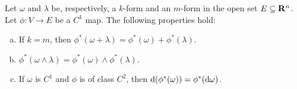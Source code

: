 \begin{proposition}
    \label{prop:algebraic-properties-pullback-forms}
    Let \(\omega\) and \(\lambda\) be, respectively, a \(k\)-form and an \(m\)-form
    in the open set \(E \subseteq \mathbf{R}^n\). Let \(\phi: V \to E\) be a \(C^{1}\)
    map. The following properties hold:
    \begin{enumerate}[(a)]\setlength\itemsep{0em}
        \item If \(k = m\), then \(\phi^{*}(\omega + \lambda) = \phi^{*}(\omega) +
              \phi^{*}(\lambda)\).
        \item \(\phi^{*}(\omega \wedge \lambda) = \phi^{*}(\omega) \wedge \phi^{*}
              (\lambda)\).
        \item If \(\omega\) is \(C^{1}\) and \(\phi\) is of class \(C^2\), then
              \(\mathrm{d}(\phi^{*}(\omega)) = \phi^{*}(\mathrm{d} \omega)\).
    \end{enumerate}
\end{proposition}

